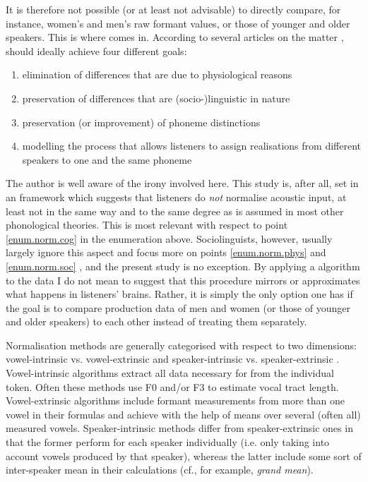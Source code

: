 It is therefore not possible (or at least not advisable) to directly compare, for instance, women's and men's raw formant values, or those of younger and older speakers.
This is where  comes in.
According to several articles on the matter \parencite[cf., for example,][]{fabriciusetal2009,clopper2009,disner1980,kendallthomas2014,thomas2002},  should ideally achieve four different goals:
\begin{enumerate}
	\item \label{enum.norm.phys}elimination of differences that are due to physiological reasons
	\item \label{enum.norm.soc}preservation of differences that are (socio-)linguistic in nature
	\item \label{enum.norm.phon}preservation (or improvement) of phoneme distinctions
	\item \label{enum.norm.cog}modelling the process that allows listeners to assign realisations from different speakers to one and the same phoneme
\end{enumerate}
The author is well aware of the irony involved here.
This study is, after all, set in an  framework which suggests that listeners do \emph{not} normalise acoustic input, at least not in the same way and to the same degree as is assumed in most other phonological theories.
This is most relevant with respect to point \ref{enum.norm.cog} in the enumeration above. Sociolinguists, however, usually largely ignore this aspect and focus more on points \ref{enum.norm.phys} and \ref{enum.norm.soc} \parencites(cf.)()[1430]{clopper2009}[414--415]{fabriciusetal2009}{kendallthomas2014}, and the present study is no exception.
By applying a  algorithm to the data I do not mean to suggest that this procedure mirrors or approximates what happens in listeners' brains.
Rather, it is simply the only option one has if the goal is to compare production data of men and women (or those of younger and older speakers) to each other instead of treating them separately.

Normalisation methods are generally categorised with respect to two dimensions: vowel-intrinsic vs. vowel-extrinsic and speaker-intrinsic vs. speaker-ex\-trin\-sic \parencite[cf.][]{kendallthomas2014}.
Vowel-intrinsic algorithms extract all data necessary for  from the individual token.
Often these methods use F0 and/or F3 to estimate vocal tract length.
Vowel-extrinsic algorithms include formant measurements from more than one vowel in their formulas and achieve  with the help of means over several (often all) measured vowels.
Speaker-intrinsic methods differ from speaker-extrinsic ones in that the former perform  for each speaker individually (i.e. only taking into account vowels produced by that speaker), whereas the latter include some sort of inter-speaker mean in their calculations (cf., for example,  \emph{grand mean}).

